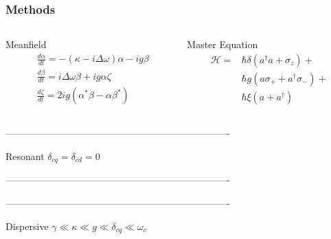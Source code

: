 \documentclass{beamer}
\begin{document}
\begin{frame}
    \frametitle{Methods}
    \begin{columns}[T]
        \begin{column}{0.5\linewidth}
            \begin{block}{Meanfield}
\begin{align}
&\frac{d \alpha}{dt} = -(\kappa -i \Delta \omega) \alpha-ig \beta\\ 
&\frac{d \beta}{dt} = i \Delta \omega \beta +ig \alpha \zeta\\ 
&\frac{d \zeta}{dt} = 2 i g(\alpha^* \beta -\alpha \beta^*)
\end{align}
            \end{block}
        \end{column}
        \begin{column}{0.5\linewidth}
            \begin{block}{Master Equation}
\begin{align} 
    \mathscr{H} = &\hbar \delta (a^\dagger a + 
    \sigma_z) + \\ \nonumber
    &\hbar g ( a \sigma_+ + a^\dagger \sigma_- ) + \\ \nonumber
    &\hbar \xi (a + a^\dagger) 
\end{align}
            \end{block}
        \end{column}
    \end{columns}
\end{frame}
----------------------------------------------------------------------
\begin{frame}
    \begin{block}{Resonant}
        $
        \delta_{cq} = \delta_{cd}=0
        $
    \end{block}
\end{frame}
----------------------------------------------------------------------
\begin{frame}
    
\end{frame}
----------------------------------------------------------------------
\begin{frame}
    \begin{block}{Dispersive}
        $
        \gamma \ll \kappa \ll g \ll \delta_{cq} \ll \omega_c
        $
    \end{block}
\end{frame}
\end{document}
